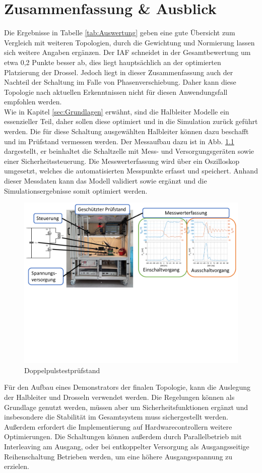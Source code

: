 \chapter{Zusammenfassung \& Ausblick}
Die Ergebnisse in Tabelle \ref{tab:Auswertung} geben eine gute Übersicht zum Vergleich mit weiteren Topologien, durch die Gewichtung und Normierung lassen sich weitere Angaben ergänzen. Der \gls{IAF} schneidet in der Gesamtbewertung um etwa 0,2 Punkte besser ab, dies liegt hauptsächlich an der optimierten Platzierung der Drossel. Jedoch liegt in dieser Zusammenfassung auch der Nachteil der Schaltung im Falle von Phasenverschiebung. Daher kann diese Topologie nach aktuellen Erkenntnissen nicht für diesen Anwendungsfall empfohlen werden.\\ 


Wie in Kapitel \ref{sec:Grundlagen} erwähnt, sind die Halbleiter Modelle ein essenzieller Teil, daher sollen diese optimiert und in die Simulation zurück geführt werden. Die für diese Schaltung ausgewählten Halbleiter können dazu beschafft und im Prüfstand vermessen werden. Der Messaufbau dazu ist in Abb. \ref{fig:dpt} dargestellt, er beinhaltet die Schaltzelle mit Mess- und Versorgungsgeräten sowie einer Sicherheitssteuerung. Die Messwerterfassung wird über ein Oszilloskop umgesetzt, welches die automatisierten Messpunkte erfasst und speichert.  Anhand dieser Messdaten kann das Modell validiert sowie ergänzt und die Simulationsergebnisse somit optimiert werden. \\

 
\begin{figure}
	\centering
	\includegraphics[width=0.9\linewidth]{content/Grafiken/DPT}
	\caption[Doppelpulstestprüfstand]{Doppelpulstestprüfstand}
	\label{fig:dpt}
\end{figure}

Für den Aufbau eines Demonstrators der finalen Topologie, kann die Auslegung der Halbleiter und Drosseln verwendet werden. Die Regelungen können als Grundlage genutzt werden, müssen aber um Sicherheitsfunktionen ergänzt und insbesondere die Stabilität im Gesamtsystem muss sichergestellt werden. Außerdem erfordert die Implementierung auf Hardwarecontrollern weitere Optimierungen. Die Schaltungen können außerdem durch Parallelbetrieb mit Interleaving am Ausgang, oder bei entkoppelter Versorgung als Ausgangsseitige Reihenschaltung Betrieben werden, um eine höhere Ausgangsspannung zu erzielen.  